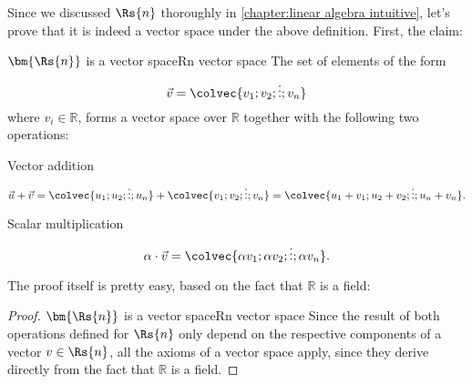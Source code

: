 Since we discussed $\Rs{n}$ thoroughly in \autoref{chapter:linear algebra intuitive}, let's prove that it is indeed a vector space under the above definition. First, the claim:

\begin{theorem}{$\bm{\Rs{n}}$ is a vector space}{Rn vector space}
	The set of elements of the form
	\[
		\vec{v} = \colvec{v_{1};v_{2};\vdots;v_{n}}
	\]
	where $v_{i}\in\mathbb{R}$, forms a vector space over $\mathbb{R}$ together with the following two operations:
	\begin{descitemize}
		\item[Vector addition]
			\[
				\vec{u}+\vec{v} = \colvec{u_{1};u_{2};\vdots;u_{n}} + \colvec{v_{1};v_{2};\vdots;v_{n}} = \colvec{u_{1}+v_{1};u_{2}+v_{2};\vdots;u_{n}+v_{n}}.
			\]
		\item[Scalar multiplication]
			\[
				\alpha\cdot\vec{v} = \colvec{\alpha v_{1};\alpha v_{2};\vdots;\alpha v_{n}}.
			\]
	\end{descitemize}
\end{theorem}

The proof itself is pretty easy, based on the fact that $\mathbb{R}$ is a field:

\begin{proof}{$\bm{\Rs{n}}$ is a vector space}{Rn vector space}
	Since the result of both operations defined for $\Rs{n}$ only depend on the respective components of a vector $v\in\Rs{n}$, all the axioms of a vector space apply, since they derive directly from the fact that $\mathbb{R}$ is a field.
\end{proof}

